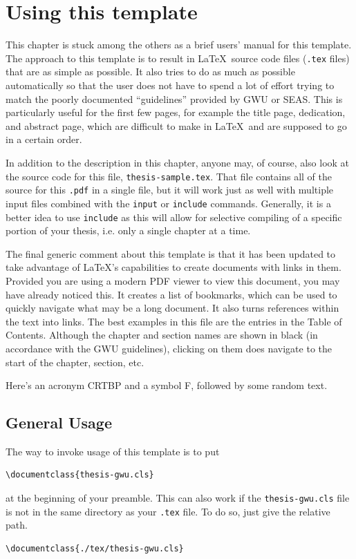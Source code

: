 \chapter{Using this template} \label{chap:intro}

This chapter is stuck among the others as a brief users' manual for this template.  
The approach to this template is to result in \LaTeX~source code files (\texttt{.tex} files) that are as simple as possible.  
It also tries to do as much as possible automatically so that the user does not have to spend a lot of effort trying to match the poorly documented ``guidelines'' provided by GWU or SEAS. 
This is particularly useful for the first few pages, for example the title page, dedication, and abstract page, which are difficult to make in \LaTeX~and are supposed to go in a certain order.

In addition to the description in this chapter, anyone may, of course, also look at the source code for this file, \texttt{thesis-sample.tex}.
That file contains all of the source for this \texttt{.pdf} in a single file, but it will work just as well with multiple input files combined with the \texttt{input} or \texttt{include} commands.
Generally, it is a better idea to use \texttt{include} as this will allow for selective compiling of a specific portion of your thesis, i.e. only a single chapter at a time.

The final generic comment about this template is that it has been updated to take advantage of \LaTeX's capabilities to create documents with links in them.  
Provided you are using a modern PDF viewer to view this document, you may have already noticed this.  
It creates a list of bookmarks, which can be used to quickly navigate what may be a long document.  
It also turns references within the text into links.  
The best examples in this file are the entries in the Table of Contents.
Although the chapter and section names are shown in black (in accordance with the GWU guidelines), clicking on them does navigate to the start of the chapter, section, etc.

Here's an acronym \ac{CRTBP} and a symbol \ac{F}, followed by some random text.

\section{General Usage}
The way to invoke usage of this template is to put
\begin{verbatim}
\documentclass{thesis-gwu.cls}
\end{verbatim}
at the beginning of your preamble.  
This can also work if the \texttt{thesis-gwu.cls} file is not in the same directory as your \texttt{.tex} file.  
To do so, just give the relative path.
\begin{verbatim}
\documentclass{./tex/thesis-gwu.cls}
\end{verbatim}

